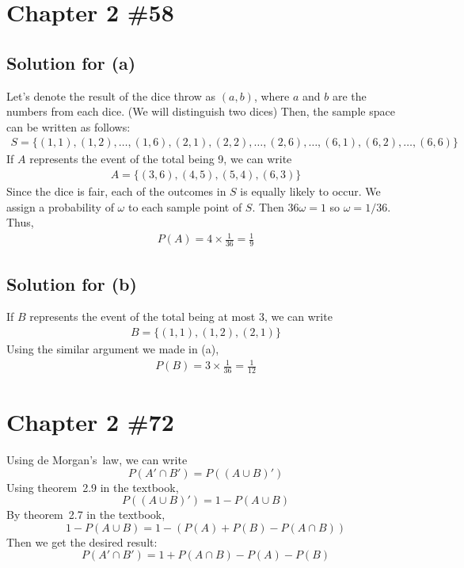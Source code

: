 \documentclass{scrartcl}
\begin{document}
\section{Chapter 2 \#58}
\subsection{Solution for (a)}
Let's denote the result of the dice throw as \((a, b)\), where \(a\) and \(b\)
are the numbers from each dice. (We will distinguish two dices)
Then, the sample space can be written as follows:
\begin{align*}
  S = \{(1, 1), (1, 2), \dots, (1, 6), (2, 1), (2, 2), \dots, (2, 6), \dots,
  (6, 1), (6, 2), \dots, (6, 6)\}
\end{align*}
If \(A\) represents the event of the total being 9, we can write
\begin{align*}
  A = \{(3, 6), (4, 5), (5, 4), (6, 3)\}
\end{align*}
Since the dice is fair, each of the outcomes in \(S\) is equally likely to
occur. We assign a probability of \(\omega\) to each sample point of \(S\).
Then \(36\omega = 1\) so \(\omega = 1 / 36\). Thus,
\begin{align*}
  P(A) = 4 \times \frac{1}{36} = \frac{1}{9}
\end{align*}

\subsection{Solution for (b)}
If \(B\) represents the event of the total being at most 3, we can write
\begin{align*}
  B = \{(1, 1), (1, 2), (2, 1)\}
\end{align*}
Using the similar argument we made in (a),
\begin{align*}
  P(B) = 3 \times \frac{1}{36} = \frac{1}{12}
\end{align*}

\section{Chapter 2 \#72}
Using de Morgan's~law, we can write
\[ P(A' \cap B') = P((A \cup B)') \]
Using theorem~2.9 in the textbook,
\[ P((A \cup B)') = 1 - P(A \cup B) \]
By theorem~2.7 in the textbook,
\[ 1 - P(A \cup B) = 1 - (P (A) + P(B) - P(A \cap B)) \]
Then we get the desired result:
\[ P(A' \cap B') = 1 + P(A \cap B) - P (A) - P(B) \]
\end{document}
